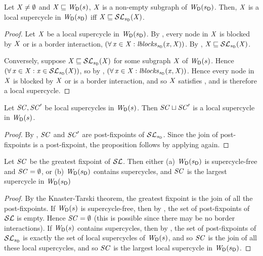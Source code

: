 \begin{proposition} \label{prop:locGFP} \label{prop:supercycleGFPLoc}
Let $\XS \ne \ewfg$ and $\XS \subg \lwfg{B}{s}{\DS}$, \ie $\XS$ is a non-empty subgraph of $\lwfg{\B}{\sD}{\DS}$.
Then, $\XS$ is a local supercycle in $\lwfg{\B}{\sD}{\DS}$ iff $\XS \subg \lSFs{\sD}{\XS}$.
\end{proposition}
%
\begin{proof}
Let $\XS$ be a local supercycle in $\lwfg{B}{\sD}{\DS}$. By , every node in $\XS$ is blocked by $\XS$ or is a border interaction, \ie 
$(\fa \ndx \in \XS: \lblocks{\sD}{\ndx}{\XS})$. By , $\XS \subg \lSFs{\sD}{\XS}$.

Conversely, suppose $\XS \subg \lSFs{\sD}{\XS}$ for some subgraph $\XS$ of $\lwfg{B}{s}{\DS}$. Hence 
$(\fa \ndx \in \XS: \ndx \in \lSFs{\sD}{\XS})$, so by , $(\fa \ndx \in \XS: \lblocks{\sD}{\ndx}{\XS})$.
Hence every node in $\XS$ is blocked by $\XS$ or is a border interaction, and so $\XS$ satisfies , and is therefore a local supercycle.
\end{proof}

\begin{proposition} \label{prop:supercycleLoc:union}
Let $\SC, \SC'$ be local supercycles in $\lwfg{B}{s}{\DS}$. Then $\SC \join \SC'$ is
a local supercycle in $\lwfg{B}{s}{\DS}$.
\end{proposition}
%
\begin{proof}
By , $\SC$ and $\SC'$ are post-fixpoints of $\lSFsymb_{\sD}$. Since the join of post-fixpoints is a post-fixpoint, 
the proposition follows by applying  again.
\end{proof}


\begin{proposition} \label{prop:GFPisLargestSCLoc}
Let $\SC$ be the greatest fixpoint of $\lSFsymb$. Then either
(a) $\lwfg{\B}{\sD}{\DS}$ is supercycle-free and $\SC = \ewfg$, or 
(b) $\lwfg{\B}{\sD}{\DS}$ contains supercycles, and $\SC$ is the largest supercycle in $\lwfg{\B}{\sD}{\DS}$ 
\end{proposition}
%
\begin{proof}
By the Knaster-Tarski theorem, the greatest fixpoint is the join of all the post-fixpoints. 
If $\lwfg{B}{s}{\DS}$ is supercycle-free, then by , the set of post-fixpoints of $\lSFsymb$ is empty. 
Hence $\SC = \ewfg$ (this is possible since there may be no border interactions). %
If $\lwfg{B}{s}{\DS}$ contains supercycles, then by ,  the set of post-fixpoints of $\lSFsymb_{\sD}$ is exactly the set of 
local supercycles of $\lwfg{B}{s}{\DS}$, and so $\SC$ is the join of all these local supercycles, and so $\SC$ is the largest local supercycle in 
$\lwfg{\B}{\sD}{\DS}$.
\end{proof}



